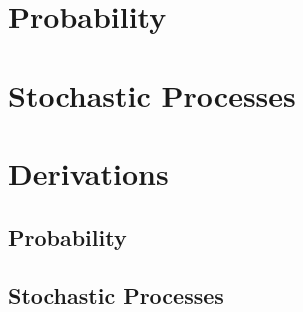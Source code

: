 \documentclass[letterpaper,10pt]{article}
\begin{document}
\raggedright

\setlength{\columnseprule}{0.5pt}

\tableofcontents

\section{Probability}

\section{Stochastic Processes}


\section{Derivations}
\subsection{Probability}

\subsection{Stochastic Processes}

\end{document}
